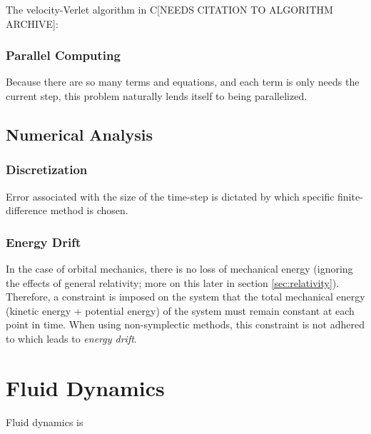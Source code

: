 \documentclass{report}
\begin{document}
                The velocity-Verlet algorithm in C[NEEDS CITATION TO ALGORITHM ARCHIVE]:

                

            \subsubsection{Parallel Computing}

                Because there are so many terms and equations, and each term is only needs the current step, this problem naturally lends itself to being parallelized\cite{parallelnbody}.

        \subsection{Numerical Analysis}

            \subsubsection{Discretization}

                Error associated with the size of the time-step is dictated by which specific finite-difference method is chosen.

            \subsubsection{Energy Drift}

                In the case of orbital mechanics, there is no loss of mechanical energy (ignoring the effects of general relativity; more on this later in section \ref{sec:relativity}).  Therefore, a constraint is imposed on the system that the total mechanical energy (kinetic energy + potential energy) of the system must remain constant at each point in time.  When using non-symplectic methods, this constraint is not adhered to which leads to \emph{energy drift}.

\pagebreak

    \section{Fluid Dynamics}

        Fluid dynamics is 
\end{document}

